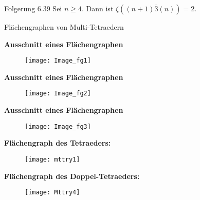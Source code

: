 \documentclass{beamer}
\begin{document}
\begin{frame}
\begin{block}{Folgerung 6.39}
Sei $n \geq 4.$ Dann ist $\zeta((n+1)\overline{3}(n))=2.$
\end{block}
\end{frame}
\begin{frame}
\begin{center}
\huge{Flächengraphen von Multi-Tetraedern}
\end{center}
\end{frame}
\begin{frame}
\textbf{Ausschnitt eines Flächengraphen}
\begin{figure}[H]
\begin{center}
\texttt{[image: Image\_fg1]}
\end{center}
\end{figure}
\end{frame}
\begin{frame}
\textbf{Ausschnitt eines Flächengraphen}
\begin{figure}[H]
\begin{center}
\texttt{[image: Image\_fg2]}
\end{center}
\end{figure}
\end{frame}
\begin{frame}
\textbf{Ausschnitt eines Flächengraphen}
\begin{figure}[H]
\begin{center}
\texttt{[image: Image\_fg3]}
\end{center}
\end{figure}
\end{frame}
\begin{frame}
\textbf{Flächengraph des Tetraeders:}
\begin{figure}[H]
\begin{center}
\texttt{[image: mttry1]}

\end{center}
\end{figure}
\end{frame}
\begin{frame}
\textbf{Flächengraph des Doppel-Tetraeders:}
\begin{figure}[H]
\begin{center}
\texttt{[image: Mttry4]}
\end{center}
\end{figure}
\end{frame}
\end{document}
